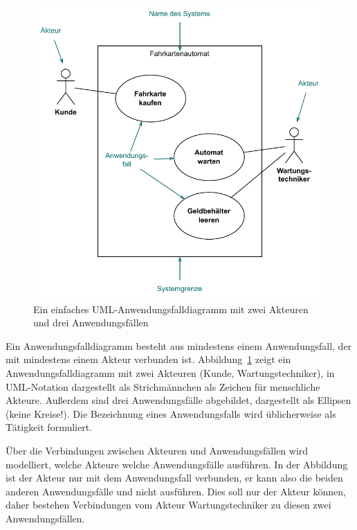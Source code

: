 \begin{figure}[h!]
	\vspace{\baselineskip} %
	\vspace{\baselineskip} %

	\centering
	\includegraphics[scale=1.0]{Bilder/Kapitel-6/Fahrkartenautomat.pdf}	
	\caption[Ein UML-Anwendungsfalldiagramm]{Ein einfaches UML-Anwendungsfalldiagramm mit zwei Akteuren und drei Anwendungsfällen}
	\label{fig:fahrkartenautomat}
\end{figure}

Ein Anwendungsfalldiagramm besteht aus mindestens einem Anwendungsfall, der mit mindestens einem Akteur verbunden ist. Abbildung~\ref{fig:fahrkartenautomat} zeigt ein Anwendungsfalldiagramm mit zwei Akteuren (Kunde, Wartungstechniker), in UML-Notation dargestellt als Strichmännchen als Zeichen für menschliche Akteure. Außerdem sind drei Anwendungsfälle abgebildet, dargestellt als Ellipsen (keine Kreise!). Die Bezeichnung eines Anwendungsfalls wird üblicherweise als Tätigkeit formuliert.

Über die Verbindungen zwischen Akteuren und Anwendungsfällen wird modelliert, welche Akteure welche Anwendungsfälle ausführen. In der Abbildung ist der Akteur  nur mit dem Anwendungsfall  verbunden, er kann also die beiden anderen Anwendungsfälle  und  nicht ausführen. Dies soll nur der Akteur  können, daher bestehen Verbindungen vom Akteur Wartungstechniker zu diesen zwei Anwendungsfällen.

